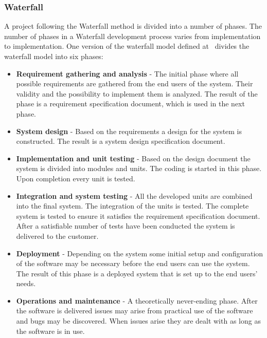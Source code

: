 \subsubsection{Waterfall}
A project following the Waterfall method is divided into a number of phases.
The number of phases in a Waterfall development process varies from implementation to implementation.
One version of the waterfall model defined at~\cite{Parekh11} divides the waterfall model into six phases:

\begin{itemize}
	\item \textbf{Requirement gathering and analysis} - The initial phase where all possible requirements are gathered from the end users of the system.
	Their validity and the possibility to implement them is analyzed.
	The result of the phase is a requirement specification document, which is used in the next phase.
	\item \textbf{System design} - Based on the requirements a design for the system is constructed. 
	The result is a system design specification document.
	\item \textbf{Implementation and unit testing} - Based on the design document the system is divided into modules and units. 
	The coding is started in this phase. 
	Upon completion every unit is tested.
	\item \textbf{Integration and system testing} - All the developed units are combined into the final system. 
	The integration of the units is tested.
	The complete system is tested to ensure it satisfies the requirement specification document.
	After a satisfiable number of tests have been conducted the system is delivered to the customer.
	\item \textbf{Deployment} - Depending on the system some initial setup and configuration of the software may be necessary before the end users can use the system. 
	The result of this phase is a deployed system that is set up to the end users' needs.
	\item \textbf{Operations and maintenance} - A theoretically never-ending phase. 
	After the software is delivered issues may arise from practical use of the software and bugs may be discovered. 
	When issues arise they are dealt with as long as the software is in use.
\end{itemize}

